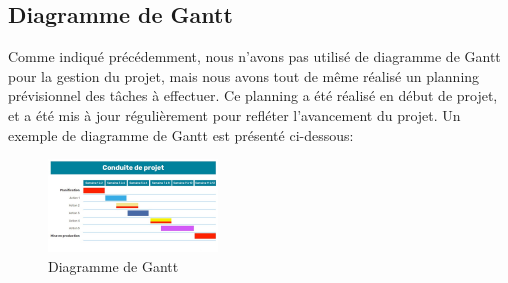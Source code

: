 \subsection{Diagramme de Gantt}

Comme indiqué précédemment, nous n'avons pas utilisé de diagramme de Gantt pour la gestion du projet, mais nous avons tout de même
réalisé un planning prévisionnel des tâches à effectuer.
Ce planning a été réalisé en début de projet, et a été mis à jour régulièrement pour refléter l'avancement du projet.
Un exemple de diagramme de Gantt est présenté ci-dessous:

\begin{figure}[!htb]
    \begin{center}
        \includegraphics[width=0.4\textwidth]{root/Diagramme-de-gantt}
    \end{center}
    \caption{Diagramme de Gantt}\label{fig:diagramme_de_gantt}
\end{figure}
